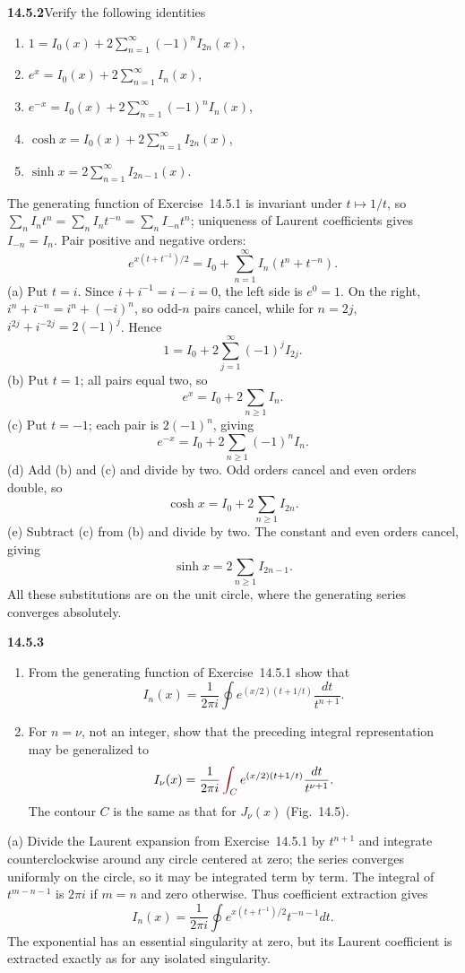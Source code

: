 \par\bigskip
\noindent\textbf{14.5.2}\quad Verify the following identities
\begin{enumerate}
\item[(a)] $1=I_{0}(x)+2\displaystyle\sum_{n=1}^{\infty}
(-1)^{n}I_{2n}(x)$,
\item[(b)] $e^{x}=I_{0}(x)+2\displaystyle\sum_{n=1}^{\infty}I_{n}(x)$,
\item[(c)] $e^{-x}=I_{0}(x)+2\displaystyle\sum_{n=1}^{\infty}
(-1)^{n}I_{n}(x)$,
\item[(d)] $\cosh x=I_{0}(x)+2\displaystyle\sum_{n=1}^{\infty}
I_{2n}(x)$,
\item[(e)] $\sinh x=2\displaystyle\sum_{n=1}^{\infty}I_{2n-1}(x)$.
\end{enumerate}
\solution
The generating function of Exercise~14.5.1 is invariant under
$t\mapsto1/t$, so
$\sum_nI_nt^n=\sum_nI_nt^{-n}=\sum_nI_{-n}t^n$; uniqueness of
Laurent coefficients gives $I_{-n}=I_n$. Pair positive and
negative orders:
\[
e^{x(t+t^{-1})/2}=I_0+
\sum_{n=1}^\infty I_n(t^n+t^{-n}).
\]
(a) Put $t=i$. Since $i+i^{-1}=i-i=0$, the left side is $e^0=1$.
On the right, $i^n+i^{-n}=i^n+(-i)^n$, so odd-$n$ pairs cancel,
while for $n=2j$, $i^{2j}+i^{-2j}=2(-1)^j$. Hence
\[
\boxed{1=I_0+2\sum_{j=1}^\infty(-1)^jI_{2j}}.
\]
(b) Put $t=1$; all pairs equal two, so
\[
\boxed{e^x=I_0+2\sum_{n\ge1}I_n}.
\]
(c) Put $t=-1$; each pair is $2(-1)^n$, giving
\[
\boxed{e^{-x}=I_0+2\sum_{n\ge1}(-1)^nI_n}.
\]
(d) Add (b) and (c) and divide by two. Odd orders cancel and
even orders double, so
\[
\boxed{\cosh x=I_0+2\sum_{n\ge1}I_{2n}}.
\]
(e) Subtract (c) from (b) and divide by two. The constant and
even orders cancel, giving
\[
\boxed{\sinh x=2\sum_{n\ge1}I_{2n-1}}.
\]
All these substitutions are on the unit circle, where the
generating series converges absolutely.

\par\bigskip
\noindent\textbf{14.5.3}
\begin{enumerate}
\item[(a)] From the generating function of Exercise~14.5.1 show that
\[
I_{n}(x)=\frac{1}{2\pi i}\oint e^{(x/2)(t+1/t)}\frac{dt}{t^{n+1}}.
\]
\item[(b)] For $n=\nu$, not an integer, show that the preceding
integral representation may be generalized to
\[
I_{\nu}(x)=\frac{1}{2\pi i}\mathop{\erratum{\int_{C}}}e^{(x/2)(t+1/t)}
\frac{dt}{t^{\nu+1}}.
\]
The contour $C$ is the same as that for $J_{\nu}(x)$ (Fig.~14.5).
\end{enumerate}
\par{}
\solution
(a) Divide the Laurent expansion from Exercise~14.5.1 by
$t^{n+1}$ and integrate counterclockwise around any circle centered
at zero; the series converges uniformly on the circle, so it may be
integrated term by term. The integral of $t^{m-n-1}$ is $2\pi i$ if
$m=n$ and zero otherwise. Thus coefficient extraction gives
\[
\boxed{I_n(x)=\frac1{2\pi i}\oint
e^{x(t+t^{-1})/2}t^{-n-1}dt}.
\]
The exponential has an essential singularity at zero, but its
Laurent coefficient is extracted exactly as for any isolated
singularity.

